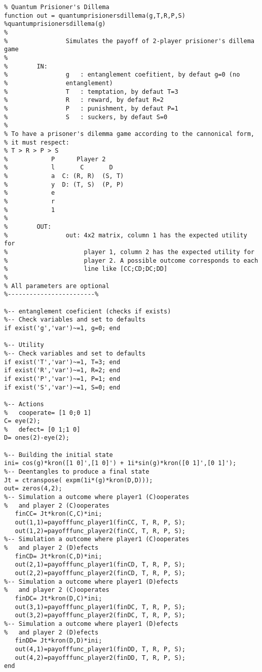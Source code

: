 \label{ap:b}


\begin{lstlisting}
% Quantum Prisioner's Dillema
function out = quantumprisionersdillema(g,T,R,P,S)
%quantumprisionersdillema(g)
%   
%                Simulates the payoff of 2-player prisioner's dillema game
%                 
%        IN:
%                g   : entanglement coefitient, by defaut g=0 (no
%                entanglement)
%                T   : temptation, by defaut T=3
%                R   : reward, by defaut R=2
%                P   : punishment, by defaut P=1
%                S   : suckers, by defaut S=0
%
% To have a prisoner's dilemma game according to the cannonical form, 
% it must respect:
% T > R > P > S
%            P      Player 2
%            l       C       D
%            a  C: (R, R)  (S, T)
%            y  D: (T, S)  (P, P)
%            e
%            r
%            1
%
%        OUT:    
%                out: 4x2 matrix, column 1 has the expected utility for
%                     player 1, column 2 has the expected utility for
%                     player 2. A possible outcome corresponds to each
%                     line like [CC;CD;DC;DD]
%                     
% All parameters are optional
%------------------------%

%-- entanglement coeficient (checks if exists)
%-- Check variables and set to defaults
if exist('g','var')~=1, g=0; end

%-- Utility
%-- Check variables and set to defaults
if exist('T','var')~=1, T=3; end
if exist('R','var')~=1, R=2; end
if exist('P','var')~=1, P=1; end
if exist('S','var')~=1, S=0; end

%-- Actions
%   cooperate= [1 0;0 1]
C= eye(2);
%   defect= [0 1;1 0]
D= ones(2)-eye(2);

%-- Building the initial state
ini= cos(g)*kron([1 0]',[1 0]') + 1i*sin(g)*kron([0 1]',[0 1]');
%-- Deentangles to produce a final state
Jt = ctranspose( expm(1i*(g)*kron(D,D)));
out= zeros(4,2);   
%-- Simulation a outcome where player1 (C)ooperates 
%   and player 2 (C)ooperates
   finCC= Jt*kron(C,C)*ini;
   out(1,1)=payofffunc_player1(finCC, T, R, P, S);
   out(1,2)=payofffunc_player2(finCC, T, R, P, S);
%-- Simulation a outcome where player1 (C)ooperates 
%   and player 2 (D)efects
   finCD= Jt*kron(C,D)*ini;
   out(2,1)=payofffunc_player1(finCD, T, R, P, S);
   out(2,2)=payofffunc_player2(finCD, T, R, P, S);
%-- Simulation a outcome where player1 (D)efects
%   and player 2 (C)ooperates
   finDC= Jt*kron(D,C)*ini;
   out(3,1)=payofffunc_player1(finDC, T, R, P, S);
   out(3,2)=payofffunc_player2(finDC, T, R, P, S);
%-- Simulation a outcome where player1 (D)efects
%   and player 2 (D)efects
   finDD= Jt*kron(D,D)*ini;
   out(4,1)=payofffunc_player1(finDD, T, R, P, S);
   out(4,2)=payofffunc_player2(finDD, T, R, P, S);
end


\end{lstlisting}
